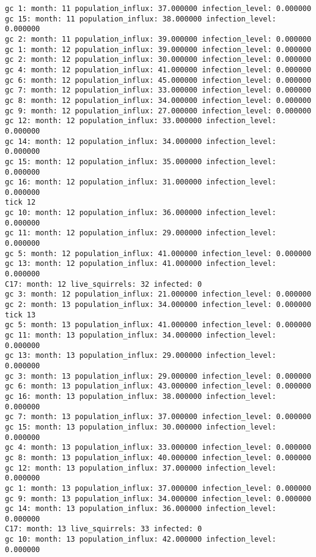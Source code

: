 \begin{lstlisting}[basicstyle=\small]
gc 1: month: 11 population_influx: 37.000000 infection_level: 0.000000
gc 15: month: 11 population_influx: 38.000000 infection_level: 0.000000
gc 2: month: 11 population_influx: 39.000000 infection_level: 0.000000
gc 1: month: 12 population_influx: 39.000000 infection_level: 0.000000
gc 2: month: 12 population_influx: 30.000000 infection_level: 0.000000
gc 4: month: 12 population_influx: 41.000000 infection_level: 0.000000
gc 6: month: 12 population_influx: 45.000000 infection_level: 0.000000
gc 7: month: 12 population_influx: 33.000000 infection_level: 0.000000
gc 8: month: 12 population_influx: 34.000000 infection_level: 0.000000
gc 9: month: 12 population_influx: 27.000000 infection_level: 0.000000
gc 12: month: 12 population_influx: 33.000000 infection_level: 0.000000
gc 14: month: 12 population_influx: 34.000000 infection_level: 0.000000
gc 15: month: 12 population_influx: 35.000000 infection_level: 0.000000
gc 16: month: 12 population_influx: 31.000000 infection_level: 0.000000
tick 12
gc 10: month: 12 population_influx: 36.000000 infection_level: 0.000000
gc 11: month: 12 population_influx: 29.000000 infection_level: 0.000000
gc 5: month: 12 population_influx: 41.000000 infection_level: 0.000000
gc 13: month: 12 population_influx: 41.000000 infection_level: 0.000000
C17: month: 12 live_squirrels: 32 infected: 0
gc 3: month: 12 population_influx: 21.000000 infection_level: 0.000000
gc 2: month: 13 population_influx: 34.000000 infection_level: 0.000000
tick 13
gc 5: month: 13 population_influx: 41.000000 infection_level: 0.000000
gc 11: month: 13 population_influx: 34.000000 infection_level: 0.000000
gc 13: month: 13 population_influx: 29.000000 infection_level: 0.000000
gc 3: month: 13 population_influx: 29.000000 infection_level: 0.000000
gc 6: month: 13 population_influx: 43.000000 infection_level: 0.000000
gc 16: month: 13 population_influx: 38.000000 infection_level: 0.000000
gc 7: month: 13 population_influx: 37.000000 infection_level: 0.000000
gc 15: month: 13 population_influx: 30.000000 infection_level: 0.000000
gc 4: month: 13 population_influx: 33.000000 infection_level: 0.000000
gc 8: month: 13 population_influx: 40.000000 infection_level: 0.000000
gc 12: month: 13 population_influx: 37.000000 infection_level: 0.000000
gc 1: month: 13 population_influx: 37.000000 infection_level: 0.000000
gc 9: month: 13 population_influx: 34.000000 infection_level: 0.000000
gc 14: month: 13 population_influx: 36.000000 infection_level: 0.000000
C17: month: 13 live_squirrels: 33 infected: 0
gc 10: month: 13 population_influx: 42.000000 infection_level: 0.000000

\end{lstlisting}
